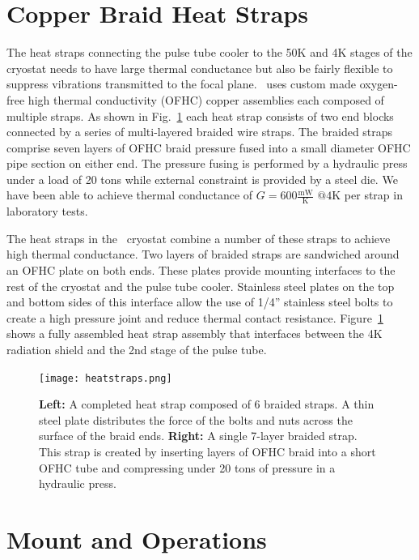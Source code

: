 \documentclass[]{spie}  %
\begin{document}
\section{Copper Braid Heat Straps}

The heat straps connecting the pulse tube cooler to the 50K and 4K stages of
the cryostat needs to have large thermal conductance but also be fairly
flexible to suppress vibrations transmitted to the focal plane. \biceparray\ 
uses custom made oxygen-free high thermal conductivity (OFHC) copper
assemblies each composed of multiple straps. As shown
in Fig.~\ref{fig:heatstrap} each heat strap consists of two end blocks
connected by a series of multi-layered braided wire straps. The braided straps
comprise seven layers of OFHC braid pressure fused into a small diameter OFHC
pipe section on either end. The pressure fusing is performed by a hydraulic
press under a load of 20 tons while external constraint is provided by a steel
die. We have been able to achieve thermal conductance of $G=600
\frac{\text{mW}}{\text{K}} \text{  @}4\text{K}$ per strap in laboratory tests.

The heat straps in the \biceparray\ cryostat combine a number of these straps
to achieve high thermal conductance. Two layers of braided straps are
sandwiched around an OFHC plate on both ends. These plates provide mounting
interfaces to the rest of the cryostat and the pulse tube cooler. Stainless
steel plates on the top and bottom sides of this interface allow the use of
1/4'' stainless steel bolts to create a high pressure joint and reduce thermal
contact resistance. Figure~\ref{fig:heatstrap} shows a fully assembled heat
strap assembly that interfaces between the 4K radiation shield and the 2nd
stage of the pulse tube.

\clearpage


\begin{figure}[ht]
\center
\texttt{[image: heatstraps.png]}
\caption{\textbf{Left:} A completed heat strap composed of 6 braided straps. A thin steel plate distributes the force of the bolts and nuts across the surface of the braid ends. \textbf{Right:} A single 7-layer braided strap. This strap is created by inserting layers of OFHC braid into a short OFHC tube and compressing under 20 tons of pressure in a hydraulic press.}
\label{fig:heatstrap}
\end{figure}


\section{Mount and Operations}
\end{document}
